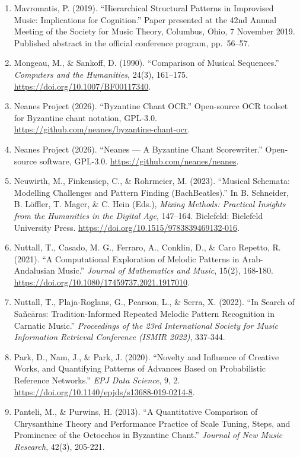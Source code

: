\documentclass[11pt,a4paper]{article}
\begin{document}
\begin{enumerate}
\item
 Mavromatis, P. (2019). ``Hierarchical Structural Patterns in Improvised Music: Implications for Cognition.'' Paper presented at the 42nd Annual Meeting of the Society for Music Theory, Columbus, Ohio, 7 November 2019. Published abstract in the official conference program, pp.~56--57.
\item
 Mongeau, M., \& Sankoff, D. (1990). ``Comparison of Musical Sequences.'' \emph{Computers and the Humanities}, 24(3), 161--175. \url{https://doi.org/10.1007/BF00117340}.
\item
 Neanes Project (2026). ``Byzantine Chant OCR.'' Open-source OCR toolset for Byzantine chant notation, GPL-3.0. \url{https://github.com/neanes/byzantine-chant-ocr}.
\item
 Neanes Project (2026). ``Neanes --- A Byzantine Chant Scorewriter.'' Open-source software, GPL-3.0. \url{https://github.com/neanes/neanes}.
\item
 Neuwirth, M., Finkensiep, C., \& Rohrmeier, M. (2023). ``Musical Schemata: Modelling Challenges and Pattern Finding (BachBeatles).'' In B. Schneider, B. Löffler, T. Mager, \& C. Hein (Eds.), \emph{Mixing Methods: Practical Insights from the Humanities in the Digital Age}, 147--164. Bielefeld: Bielefeld University Press. \url{https://doi.org/10.1515/9783839469132-016}.
\item
 Nuttall, T., Casado, M. G., Ferraro, A., Conklin, D., \& Caro Repetto, R. (2021). ``A Computational Exploration of Melodic Patterns in Arab-Andalusian Music.'' \emph{Journal of Mathematics and Music}, 15(2), 168-180. \url{https://doi.org/10.1080/17459737.2021.1917010}.
\item
 Nuttall, T., Plaja-Roglans, G., Pearson, L., \& Serra, X. (2022). ``In Search of Sañcāras: Tradition-Informed Repeated Melodic Pattern Recognition in Carnatic Music.'' \emph{Proceedings of the 23rd International Society for Music Information Retrieval Conference (ISMIR 2022)}, 337-344.
\item
 Park, D., Nam, J., \& Park, J. (2020). ``Novelty and Influence of Creative Works, and Quantifying Patterns of Advances Based on Probabilistic Reference Networks.'' \emph{EPJ Data Science}, 9, 2. \url{https://doi.org/10.1140/epjds/s13688-019-0214-8}.
\item
 Panteli, M., \& Purwins, H. (2013). ``A Quantitative Comparison of Chrysanthine Theory and Performance Practice of Scale Tuning, Steps, and Prominence of the Octoechos in Byzantine Chant.'' \emph{Journal of New Music Research}, 42(3), 205-221.

\end{enumerate}
\end{document}
